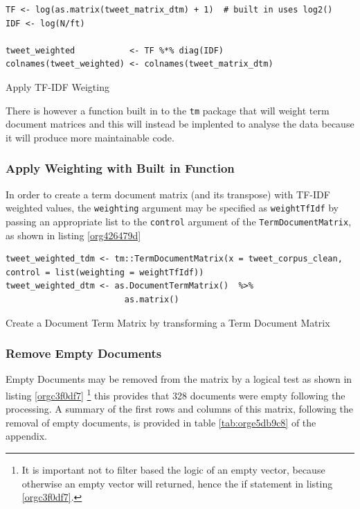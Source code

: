 \documentclass[11pt]{article}
\begin{document}
\begin{enumerate}
\begin{listing}[htbp]
\begin{verbatim}
TF <- log(as.matrix(tweet_matrix_dtm) + 1)  # built in uses log2()
IDF <- log(N/ft)

tweet_weighted           <- TF %*% diag(IDF)
colnames(tweet_weighted) <- colnames(tweet_matrix_dtm)
\end{verbatim}
\caption{\label{org111d013}Apply TF-IDF Weigting}
\end{listing}

There is however a function built in to the \texttt{tm} package that will weight term document matrices and this will instead be implented to analyse the data because it will produce more maintainable code.
\end{enumerate}

\subsubsection{Apply Weighting with Built in Function}
\label{sec:orgb6d238c}
In order to create a term document matrix (and its transpose) with TF-IDF weighted values, the \texttt{weighting} argument may be specified as \texttt{weightTfIdf} by passing an appropriate list to the \texttt{control} argument of the \texttt{TermDocumentMatrix}, as shown in listing \ref{org426479d}

\begin{listing}[htbp]
\begin{verbatim}
tweet_weighted_tdm <- tm::TermDocumentMatrix(x = tweet_corpus_clean, control = list(weighting = weightTfIdf))
tweet_weighted_dtm <- as.DocumentTermMatrix()  %>%
                        as.matrix()
\end{verbatim}
\caption{\label{org426479d}Create a Document Term Matrix by transforming a Term Document Matrix}
\end{listing}

\subsubsection{Remove Empty Documents}
\label{sec:orgf51b588}
Empty Documents may be removed from the matrix by a logical test as shown in listing  \ref{orgc3f0df7} \footnote{It is important not to filter based the logic of an empty vector, because
otherwise an empty vector will returned, hence the if statement in listing \ref{orgc3f0df7}.} this provides that 328 documents were empty following the processing. A summary of the first rows and columns of this matrix, following the removal of empty documents, is provided in table \ref{tab:orge5db9c8} of the appendix.
\end{document}

